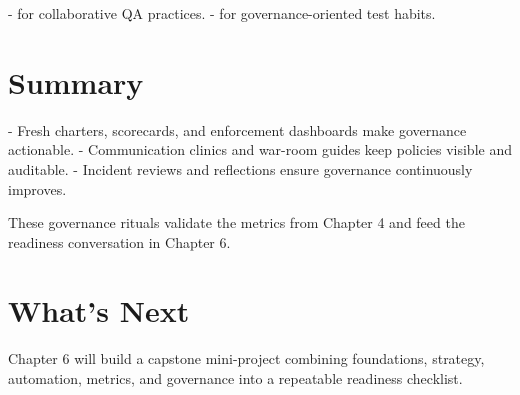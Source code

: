 - \citep{kaner2002testing} for collaborative QA practices.
- \citep{beizer1995software} for governance-oriented test habits.
\section{Summary}

- Fresh charters, scorecards, and enforcement dashboards make governance actionable.
- Communication clinics and war-room guides keep policies visible and auditable.
- Incident reviews and reflections ensure governance continuously improves.

These governance rituals validate the metrics from Chapter 4 and feed the readiness conversation in Chapter 6.

\section{What's Next}

Chapter 6 will build a capstone mini-project combining foundations, strategy, automation, metrics, and governance into a repeatable readiness checklist.
